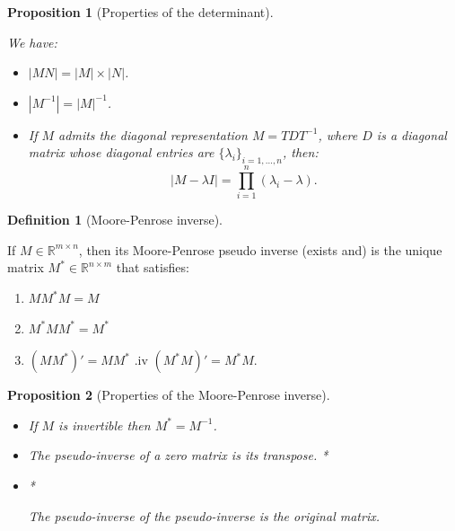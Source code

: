 \documentclass[
  12pt,
]{book}
\providecommand{\tightlist}{%
  \setlength{\itemsep}{0pt}\setlength{\parskip}{0pt}}
\newtheorem{proposition}{Proposition}[chapter]
\theoremstyle{definition}
\newtheorem{definition}{Definition}[chapter]
\theoremstyle{definition}
\theoremstyle{definition}
\theoremstyle{definition}
\theoremstyle{remark}
\begin{document}
\begin{proposition}[Properties of the determinant]
\protect\hypertarget{prp:determinant}{}\label{prp:determinant}

We have:

\begin{itemize}
\tightlist
\item
  \(|MN|=|M|\times|N|\).
\item
  \(|M^{-1}|=|M|^{-1}\).
\item
  If \(M\) admits the diagonal representation \(M=TDT^{-1}\), where \(D\) is a diagonal matrix whose diagonal entries are \(\{\lambda_i\}_{i=1,\dots,n}\), then:
  \[
  |M - \lambda I |=\prod_{i=1}^n (\lambda_i - \lambda).
  \]
\end{itemize}

\end{proposition}

\begin{definition}[Moore-Penrose inverse]
\protect\hypertarget{def:MoorPenrose}{}\label{def:MoorPenrose}

If \(M \in \mathbb{R}^{m \times n}\), then its Moore-Penrose pseudo inverse (exists and) is the unique matrix \(M^* \in \mathbb{R}^{n \times m}\) that satisfies:

\begin{enumerate}
\def\labelenumi{\roman{enumi}.}
\tightlist
\item
  \(M M^* M = M\)
\item
  \(M^* M M^* = M^*\)
\item
  \((M M^*)'=M M^*\)
  .iv \((M^* M)'=M^* M\).
\end{enumerate}

\end{definition}

\begin{proposition}[Properties of the Moore-Penrose inverse]
\protect\hypertarget{prp:MoorPenrose}{}\label{prp:MoorPenrose}\leavevmode

\begin{itemize}
\tightlist
\item
  If \(M\) is invertible then \(M^* = M^{-1}\).
\item
  The pseudo-inverse of a zero matrix is its transpose.
  *

  \item*

  The pseudo-inverse of the pseudo-inverse is the original matrix.
\end{itemize}

\end{proposition}
\end{document}
